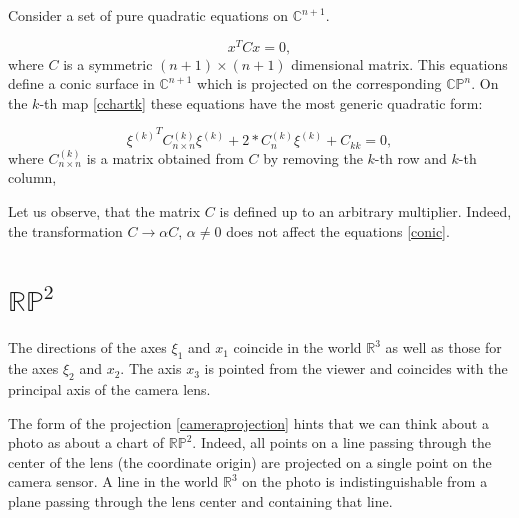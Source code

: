 \documentclass[a4paper,10pt]{article}
\newcommand{\diag}{\mathop{\mathrm{diag}}}
\begin{document}
Consider a set of pure quadratic equations on $\mathbb{C}^{n+1}$.

\begin{equation}
 x^T C x = 0,\label{conic}
\end{equation}
where  $C$ is a symmetric $(n+1) \times (n+1)$ dimensional matrix. This equations define a conic surface in $\mathbb{C}^{n+1}$ which is projected on the corresponding $\mathbb{CP}^n$. On the $k$-th map \eqref{cchartk} these equations have the most generic quadratic form:

\begin{equation}
{\xi^{(k)}}^TC^{(k)}_{n\times n}\xi^{(k)} + 2* C^{(k)}_{n}\xi^{(k)} + C_{kk} = 0,
\end{equation}
where $C^{(k)}_{n\times n}$ is a matrix obtained from $C$ by removing the $k$-th row and $k$-th column, 


Let us observe, that the matrix $C$ is defined up to an arbitrary multiplier. Indeed, the transformation $C\to \alpha C$, $\alpha\neq 0$ does not affect the equations \eqref{conic}.

 

 





\section{$\mathbb{RP}^2$}


The directions of the axes $\xi_1$ and $x_1$ coincide in the world $\mathbb{R}^3$ as well as those for the axes  $\xi_2$ and $x_2$. The axis $x_3$ is pointed from the viewer and coincides with the principal axis of the camera lens. 

The form of the projection \eqref{cameraprojection} hints that we can think about a photo as about a chart of $\mathbb{RP}^2$. Indeed, all points on a line passing through the center of the lens (the coordinate origin) are projected on a single point on the camera sensor. A line in the world $\mathbb{R}^3$ on the photo is indistinguishable from a plane passing through the lens center and containing that line.  
\end{document}
